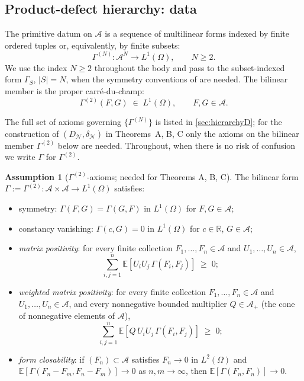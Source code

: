 \documentclass[11pt,reqno]{amsart}
\theoremstyle{plain}
\theoremstyle{definition}
\newtheorem{assumption}[theorem]{Assumption}
\theoremstyle{remark}
\newcommand{\R}{\mathbb{R}}
\newcommand{\E}{\mathbb{E}}
\newcommand{\cA}{\mathcal A}
\newcommand{\cN}{\mathcal N}
\newcommand{\dN}{D_{\cN}}
\newcommand{\divN}{\delta_{\cN}}
\begin{document}
\subsection{Product-defect hierarchy: data}\label{sec:setup-hierarchy}

The primitive datum on $\cA$ is a sequence of multilinear forms
indexed by finite ordered tuples or, equivalently, by finite
subsets:
\begin{equation}\label{eq:hierarchy}
  \Gamma^{(N)}\colon\cA^{N}\to L^{1}(\Omega),\qquad N\ge 2.
\end{equation}
We use the index $N\ge 2$ throughout the body and pass to
the subset-indexed form $\Gamma_{S}$, $|S|=N$, when the symmetry
conventions of \cite[Def.~6.10]{PrimitiveDivergence} are needed.
The bilinear member is the proper carr\'e-du-champ:
\[
  \Gamma^{(2)}(F,G)\;\in\; L^{1}(\Omega),\qquad F,G\in\cA.
\]

The full set of axioms governing $\{\Gamma^{(N)}\}$ is listed in
\cref{sec:hierarchyD}; for the construction of $(\dN,\divN)$
in Theorems~A, B, C only the axioms on the bilinear member
$\Gamma^{(2)}$ below are needed. Throughout, when there is no
risk of confusion we write $\Gamma$ for $\Gamma^{(2)}$.

\begin{assumption}[$\Gamma^{(2)}$-axioms; needed for Theorems A, B, C]\label{ass:gamma2}
The bilinear form $\Gamma:=\Gamma^{(2)}\colon\cA\times\cA\to L^{1}(\Omega)$
satisfies:
\begin{itemize}
\item[\textsc{(Sym)}] symmetry: $\Gamma(F,G)=\Gamma(G,F)$
in $L^{1}(\Omega)$ for $F,G\in\cA$;
\item[\textsc{(Vanish)}] constancy vanishing:
$\Gamma(c,G)=0$ in $L^{1}(\Omega)$ for $c\in\R$, $G\in\cA$;
\item[\textsc{(MatPos)}] \emph{matrix positivity}: for every finite
collection $F_{1},\ldots,F_{n}\in\cA$ and $U_{1},\ldots,U_{n}\in\cA$,
\begin{equation}\label{eq:matpos}
  \sum_{i,j=1}^{n}\E\!\left[U_{i}U_{j}\,\Gamma(F_{i},F_{j})\right]\;\ge\;0;
\end{equation}
\item[\textsc{(WMatPos)}] \emph{weighted matrix positivity}: for
every finite collection $F_{1},\ldots,F_{n}\in\cA$ and
$U_{1},\ldots,U_{n}\in\cA$, and every nonnegative bounded
multiplier $Q\in\cA_{+}$ (the cone of nonnegative elements of
$\cA$),
\begin{equation}\label{eq:wmatpos}
  \sum_{i,j=1}^{n}\E\!\left[Q\,U_{i}U_{j}\,\Gamma(F_{i},F_{j})\right]\;\ge\;0;
\end{equation}
\item[\textsc{(FormClos)}] \emph{form closability}: if
$(F_{n})\subset\cA$ satisfies $F_{n}\to 0$ in $L^{2}(\Omega)$ and
$\E[\Gamma(F_{n}-F_{m},F_{n}-F_{m})]\to 0$ as $n,m\to\infty$,
then $\E[\Gamma(F_{n},F_{n})]\to 0$.
\end{itemize}
\end{assumption}
\end{document}
